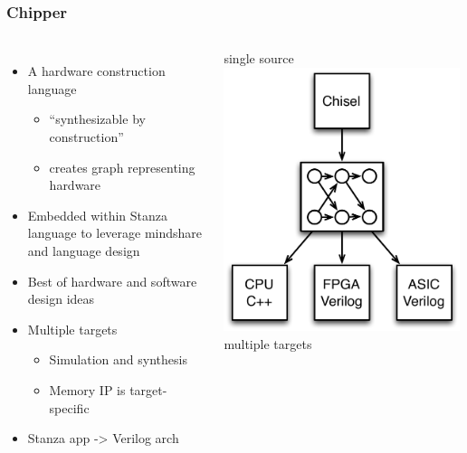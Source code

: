 \documentclass[xcolor=pdflatex,dvipsnames,table]{beamer}
\begin{document}
\begin{frame}[fragile]
\frametitle{Chipper}

\begin{columns}[c]


\begin{itemize}
\item A hardware construction language 
\begin{itemize}
\item ``synthesizable by construction''
\item creates graph representing hardware
\end{itemize}
\item Embedded within Stanza language to leverage mindshare and language design
\item Best of hardware and software design ideas
\item Multiple targets
\begin{itemize}
\item Simulation and synthesis
\item Memory IP is target-specific \\[0.5cm]
\end{itemize}
\item {\color{red}{\bf Not} Stanza app -> Verilog arch}
\end{itemize}


\begin{center}
single source \\
\includegraphics[width=0.99\textwidth]{figs/graph-and-targets.pdf} \\
multiple targets \\
\end{center}


\end{columns}
\end{frame}
\end{document}
